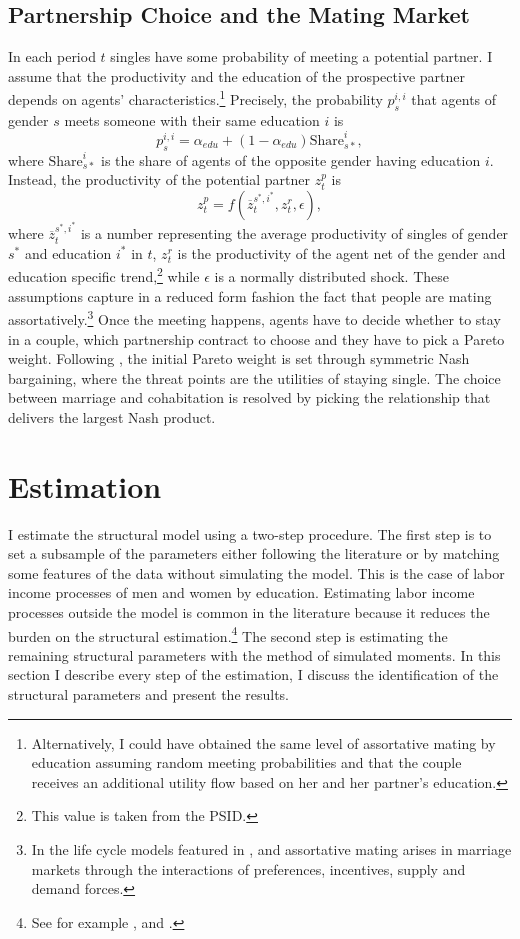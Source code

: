 \documentclass[12pt]{article}
\begin{document}
\subsection{Partnership Choice and the Mating Market}\label{ssec:marriage_market}
In each period $t$ singles have some probability of meeting a potential partner. I assume that the productivity and the education of the prospective partner depends on agents' characteristics.\footnote{Alternatively, I could have obtained the same level of assortative mating by education assuming random meeting probabilities and that the couple receives an additional utility flow based on her and her partner's education.} Precisely, the probability $p_s^{i,i}$ that agents of gender $s$ meets someone with their same education $i$ is 
\begin{equation}\label{eq:mma}
p_s^{i,i}=\alpha_{edu}+(1-\alpha_{edu}) \text{Share}_{s*}^i,
\end{equation}
where $ \text{Share}_{s*}^i$ is the share of agents of the opposite gender having education $i$. Instead, the productivity of the potential partner $z_t^p$ is
\begin{equation}\label{eq:mmz}
z_t^p=f(\overline{z}^{s^*,i^*}_t,z^r_t,\epsilon),
\end{equation}
where $\overline{z}^{s^*,i^*}_t$ is a number representing the average productivity of singles of gender $s^*$ and education $i^*$ in $t$, $z^r_t$ is the productivity of the agent net of the gender and education specific trend,\footnote{This value is taken from the PSID.} while $\epsilon$ is a normally distributed shock. These assumptions capture in a reduced form fashion the fact that people are mating assortatively.\footnote{In the life cycle models featured in \cite{ciscato2019}, \cite{shephard2019} and \cite{reynoso2019} assortative mating arises in marriage markets through the interactions of preferences, incentives, supply and demand forces.}
Once the meeting happens, agents have to decide whether to stay in a couple, which partnership contract to choose and they have to pick a Pareto weight. Following \cite{mazzocco2007}, the initial Pareto weight is set through symmetric Nash bargaining, where the threat points are the utilities of staying single. The choice between marriage and cohabitation is resolved by picking the relationship that delivers the largest Nash product.
\section{Estimation}
I estimate the structural model using a two-step procedure. The first step is to set a subsample of the parameters either following the literature or by matching some features of the data without simulating the model. This is the case of labor income processes of men and women by education. Estimating labor income processes outside the model is common in the literature because it reduces the burden on the structural estimation.\footnote{See for example \cite{voena2015}, \cite{reynoso2019} and \cite{gourinchas2002}.} The second step is estimating the remaining structural parameters with the method of simulated moments. In this section I describe every step of the estimation, I discuss the identification of the structural parameters and present the results.
\end{document}

